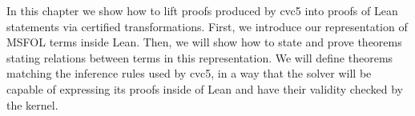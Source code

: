 In this chapter we show how to lift proofs produced by cvc5 into
proofs of Lean statements via certified transformations.
First, we introduce our representation of MSFOL terms inside Lean.
Then, we will show how to state and prove theorems stating relations
between terms in this representation. We will define theorems matching
the inference rules used by cvc5, in a way that the solver will be
capable of expressing its proofs inside of Lean and have their validity
checked by the kernel.





